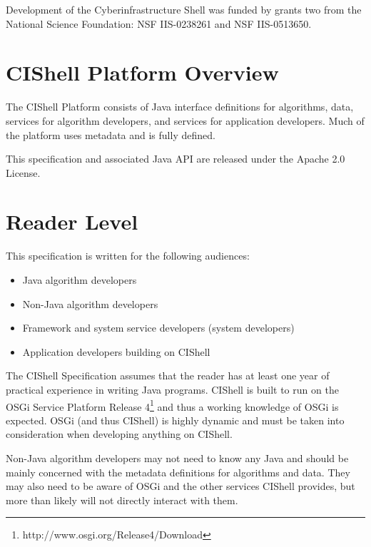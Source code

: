 Development of the Cyberinfrastructure Shell was funded by grants two from the
National Science Foundation: NSF IIS-0238261 and NSF IIS-0513650.

\section{CIShell Platform Overview}

The CIShell Platform consists of Java interface definitions for algorithms, data,
services for algorithm developers, and services for application developers. Much
of the platform uses metadata and is fully defined.

This specification and associated Java API are released under the Apache 2.0
License.



\section{Reader Level}

This specification is written for the following audiences:
\begin{itemize}
  \item Java algorithm developers
  \item Non-Java algorithm developers
  \item Framework and system service developers (system developers)
  \item Application developers building on CIShell
\end{itemize}

The CIShell Specification assumes that the reader has at least one year of
practical experience in writing Java programs. CIShell is built to run on the
OSGi Service Platform Release 4\footnote{http://www.osgi.org/Release4/Download}
and thus a working knowledge of OSGi is expected. OSGi (and thus CIShell) is
highly dynamic and must be taken into consideration when developing anything on
CIShell.

Non-Java algorithm developers may not need to know any Java and should be mainly
concerned with the metadata definitions for algorithms and data. They may also
need to be aware of OSGi and the other services CIShell provides, but more than
likely will not directly interact with them.

